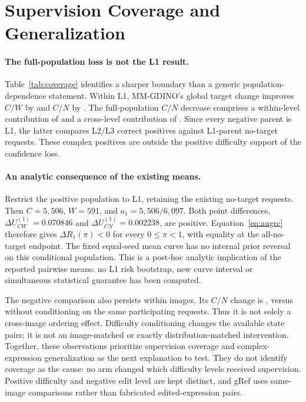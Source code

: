 \documentclass[10pt,twocolumn,letterpaper]{article}
\begin{document}
\section{Supervision Coverage and Generalization}

\paragraph{The full-population loss is not the L1 result.}
Table~\ref{tab:coverage} identifies a sharper boundary than a generic
population-dependence statement. Within L1, MM-GDINO's global target
change improves $C/W$ by \LoneCW{} and $C/N$ by \LoneCN{}.
The full-population $C/N$ decrease comprises a within-level contribution
of \WithinCN{} and a cross-level contribution of \AcrossCN{}.
Since every negative parent is L1, the latter compares L2/L3 correct
positives against L1-parent no-target requests. These complex positives
are outside the positive difficulty support of the confidence loss.

\paragraph{An analytic consequence of the existing means.}
Restrict the positive population to L1, retaining the existing no-target
requests. Then $C=5{,}506$, $W=591$, and $a_1=5{,}506/6{,}097$.
Both point differences, $\Delta U_{CW}^{(1)}=0.070846$ and
$\Delta U_{CN}^{(1)}=0.002238$, are positive. Equation~\ref{eq:augrc}
therefore gives $\Delta R_1(\pi)<0$ for every $0\leq\pi<1$, with
equality at the all-no-target endpoint. The fixed equal-seed mean curve
has no internal prior reversal on this conditional population.
This is a post-hoc analytic implication of the reported pairwise means:
no L1 risk bootstrap, new curve interval or simultaneous statistical
guarantee has been computed.

The negative comparison also persists within images. Its $C/N$ change
is \SameImageCN{}, versus \ComparableCN{} without conditioning on
the same participating requests. Thus it is not solely a cross-image
ordering effect. Difficulty conditioning changes the available state
pairs; it is not an image-matched or exactly distribution-matched
intervention. Together, these observations prioritize supervision coverage
and complex-expression generalization as the next explanation to test.
They do not identify coverage as the cause: no arm changed which difficulty
levels received supervision. Positive difficulty and negative edit level
are kept distinct, and gRef uses same-image comparisons rather than
fabricated edited-expression pairs.
\end{document}
